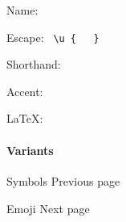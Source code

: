 { }

\subsubsection{\texorpdfstring{{ }}{ }}\label{section}

Name: \texttt{\ }


Escape: \texttt{\ \textbackslash{}u\ \{\ }{\texttt{\ }}\texttt{\ \}\ }


Shorthand: \texttt{\ }

{ }

Accent:


LaTeX: \texttt{\ }

\paragraph{Variants}\label{variants}

{ }

\href{/docs/reference/symbols/}{\pandocbounded{}}

{ Symbols } { Previous page }

\href{/docs/reference/symbols/emoji/}{\pandocbounded{}}

{ Emoji } { Next page }
